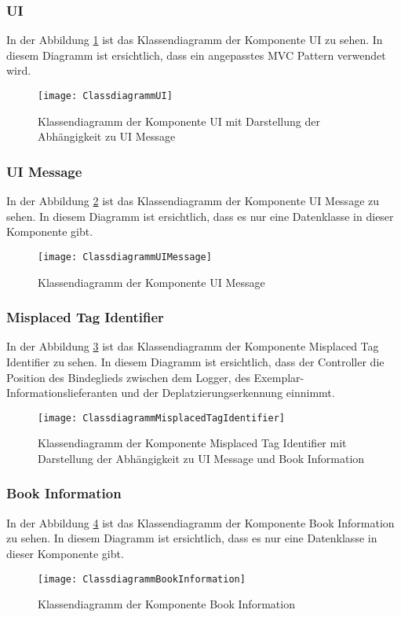 \clearpage
\subsubsection{UI}
In der Abbildung \ref{fig:ClassUI} ist das Klassendiagramm der Komponente UI zu sehen.
In diesem Diagramm ist ersichtlich, dass ein angepasstes MVC Pattern verwendet wird.
\begin{figure}[htb]
	\centering
	\texttt{[image: ClassdiagrammUI]}
	\caption{Klassendiagramm der Komponente UI mit Darstellung der Abhängigkeit zu UI Message}
	\label{fig:ClassUI}
\end{figure}
\subsubsection{UI Message}
In der Abbildung \ref{fig:ClassUIMessage} ist das Klassendiagramm der Komponente UI Message zu sehen.
In diesem Diagramm ist ersichtlich, dass es nur eine Datenklasse in dieser Komponente gibt.
\begin{figure}[htb]
	\centering
	\texttt{[image: ClassdiagrammUIMessage]}
	\caption{Klassendiagramm der Komponente UI Message}
	\label{fig:ClassUIMessage}
\end{figure}

\clearpage
\subsubsection{Misplaced Tag Identifier}
In der Abbildung \ref{fig:ClassMisplacedTagIdentifier} ist das Klassendiagramm der Komponente Misplaced Tag Identifier zu sehen.
In diesem Diagramm ist ersichtlich, dass der Controller die Position des Bindeglieds zwischen dem Logger, des Exemplar-Informationslieferanten und der Deplatzierungserkennung einnimmt.
\begin{figure}[htb]
	\centering
	\texttt{[image: ClassdiagrammMisplacedTagIdentifier]}
	\caption{Klassendiagramm der Komponente Misplaced Tag Identifier mit Darstellung der Abhängigkeit zu UI Message und Book Information}
	\label{fig:ClassMisplacedTagIdentifier}
\end{figure}

\subsubsection{Book Information}
In der Abbildung \ref{fig:ClassBookInformation} ist das Klassendiagramm der Komponente Book Information zu sehen.
In diesem Diagramm ist ersichtlich, dass es nur eine Datenklasse in dieser Komponente gibt.
\begin{figure}[htb]
	\centering
	\texttt{[image: ClassdiagrammBookInformation]}
	\caption{Klassendiagramm der Komponente Book Information}
	\label{fig:ClassBookInformation}
\end{figure}

